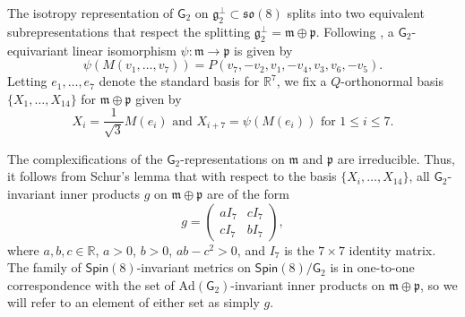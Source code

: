 \documentclass{amsart}
\numberwithin{equation}{section}
\theoremstyle{plain}
\theoremstyle{definition}
\theoremstyle{remark}
\numberwithin{table}{section}
\DeclareMathOperator{\diag}{diag}
\newcommand{\gG}{\mathsf{G}}
\newcommand{\SO}{\mathsf{SO}}
\newcommand{\Spin}{\mathsf{Spin}}
\newcommand{\fg}{\mathfrak{g}}
\newcommand{\fm}{\mathfrak{m}}
\newcommand{\fp}{\mathfrak{p}}
\newcommand{\so}{\mathfrak{so}}
\newcommand{\bR}{\mathbb{R}}
\begin{document}
    The isotropy representation of $\gG_2$ on $\fg_2^\perp \subset \so(8)$ splits into two equivalent subrepresentations that respect the splitting $\fg_2^\perp = \fm \oplus \fp$.
    Following \cite[Equation 21]{Kerin11}, a $\gG_2$-equivariant linear isomorphism $\psi:\fm \to \fp$ is given by
    \[
        \psi(M(v_1, \dots ,v_7)) = P(v_7, -v_2, v_1, -v_4, v_3, v_6, -v_5).
    \]
    Letting $e_1,\dots,e_7$ denote the standard basis for $\bR^7$, we fix a $Q$-orthonormal basis $\{X_1,\dots,X_{14}\}$ for $\fm \oplus \fp$ given by 
        \begin{equation}\label{eq:Xi}
            X_i = \frac{1}{\sqrt{3}}M(e_i)\text{ and }X_{i+7} = \psi(M(e_i))\text{ for }1 \leq i \leq 7.
        \end{equation}
    
    The complexifications of the $\gG_2$-representations on $\fm$ and $\fp$ are irreducible.
    Thus, it follows from Schur's lemma that with respect to the basis $\{X_i,\dots,X_{14}\}$, all $\gG_2$-invariant inner products $g$ on $\fm\oplus\fp$ are of the form 
    \[
        g = \begin{pmatrix}
            a I_7 & c I_7 \\
            c I_7 & b I_7
        \end{pmatrix},
    \]
    where $a,b,c\in\bR$, $a>0$, $b>0$, $ab-c^2 > 0$, and $I_7$ is the $7 \times 7$ identity matrix.
    The family of $\Spin(8)$-invariant metrics on $\Spin(8)/\gG_2$ is in one-to-one correspondence with the set of $\mathrm{Ad}(\gG_2)$-invariant inner products on $\fm\oplus\fp$, so we will refer to an element of either set as simply $g$.
    
        

    
    
    
    
    
    
\end{document}
